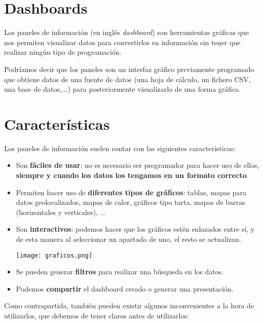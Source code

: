 \chapter{Dashboards}

Los paneles de información (en inglés \textit{dashboard}) son herramientas gráficas que nos permiten visualizar datos para convertirlos en información sin tener que realizar ningún tipo de programación.

Podríamos decir que los paneles son un interfaz gráfico previamente programado que obtiene datos de una fuente de datos (una hoja de cálculo, un fichero CSV, una base de datos,...) para posteriormente visualizarlo de una forma gráfica.

\chapter{Características}

Los paneles de información suelen contar con las siguientes características:

\begin{itemize}
    \item Son \textbf{fáciles de usar}: no es necesario ser programador para hacer uso de ellos, \textbf{siempre y cuando los datos los tengamos en un formato correcto}.
    \item Permiten hacer uso de \textbf{diferentes tipos de gráficos}: tablas, mapas para datos geolocalizados, mapas de calor, gráficos tipo tarta, mapas de barras (horizontales y verticales), ...

    \item Son \textbf{interactivos}: podemos hacer que los gráficos estén enlazados entre sí, y de esta manera al seleccionar un apartado de uno, el resto se actualizan.

    \begin{center}
        \texttt{[image: graficos.png]}
    \end{center}

    \item Se pueden generar \textbf{filtros} para realizar una búsqueda en los datos.

    \item Podemos \textbf{compartir} el dashboard creado o generar una presentación.

\end{itemize}


Como contrapartida, también pueden existir algunos inconvenientes a la hora de utilizarlos, que debemos de tener claros antes de utilizarlos:

